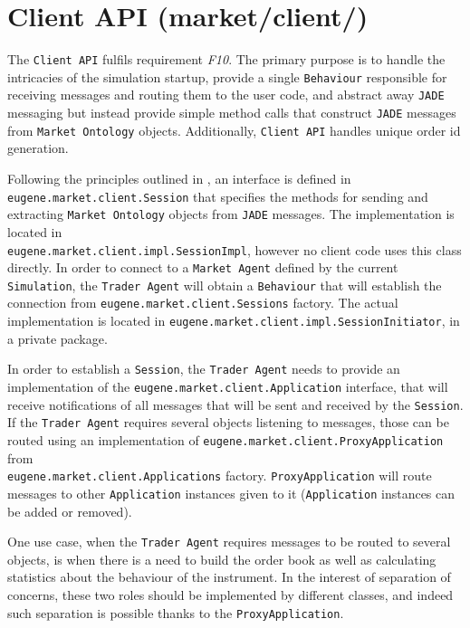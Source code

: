 \section{Client API (market/client/)}
\label{Chapters/Background/Client-API}
The \texttt{Client API} fulfils requirement \textit{F10}. The primary purpose is to handle the intricacies of the simulation startup, provide  a single \texttt{Behaviour} responsible for receiving messages and routing them to the user code, and abstract away \texttt{JADE} messaging but instead provide simple method calls that construct \texttt{JADE} messages from \texttt{Market Ontology} objects. Additionally, \texttt{Client API} handles unique order id generation.

Following the principles outlined in , an interface is defined in \\ \texttt{eugene.market.client.Session} that specifies the methods for sending   and extracting \texttt{Market Ontology} objects from \texttt{JADE} messages. The implementation is located in \\\texttt{eugene.market.client.impl.SessionImpl}, however no client code uses this class directly. In order to connect to a \texttt{Market Agent} defined by the current \texttt{Simulation}, the \texttt{Trader Agent} will obtain a \texttt{Behaviour} that will establish the connection from \texttt{eugene.market.client.Sessions} factory. The actual implementation is located in \texttt{eugene.market.client.impl.SessionInitiator}, in a private package. 

In order to establish a \texttt{Session}, the \texttt{Trader Agent} needs to provide an implementation of the \texttt{eugene.market.client.Application} interface, that will receive notifications of all messages that will be sent and received by the \texttt{Session}. If the \texttt{Trader Agent} requires several objects listening to messages, those can be routed using an implementation of \texttt{eugene.market.client.ProxyApplication} from \\\texttt{eugene.market.client.Applications} factory. \texttt{ProxyApplication} will route messages to other \texttt{Application} instances given to it (\texttt{Application} instances can be added or removed).

One use case, when the \texttt{Trader Agent} requires messages to be routed to several objects, is when there is a need to build the order book as well as calculating statistics about the behaviour of the instrument. In the interest of separation of concerns, these two roles should be implemented by different classes, and indeed such separation is possible thanks to the \texttt{ProxyApplication}.

